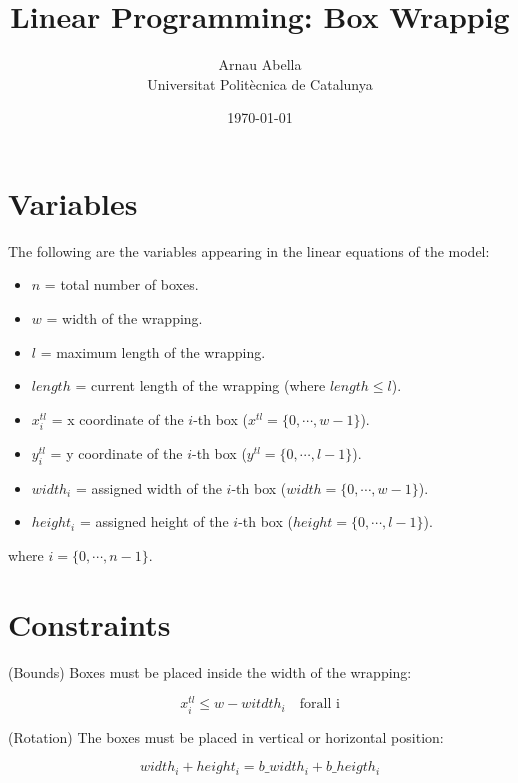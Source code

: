 \documentclass[12pt, a4paper]{article} %
\title{%
  Linear Programming: Box Wrappig
}
\author{%
  Arnau Abella \\
  \large{Universitat Polit\`ecnica de Catalunya}
}
\date{\today}
\begin{document}
\maketitle


\section{Variables}\label{variables}

The following are the variables appearing in the linear equations of the model:

\begin{itemize}
  \setlength{\itemindent}{-.0in}
  \item[] $n$ = total number of boxes.
  \item[] $w$ = width of the wrapping.
  \item[] $l$ = maximum length of the wrapping.
  \item[] $length$ = current length of the wrapping (where $length \leq l$).
  \item[] $x^{tl}_i$ = x coordinate of the $i$-th box (${x^{tl} = \{0,\cdots, w-1\}}$).
  \item[] $y^{tl}_i$ = y coordinate of the $i$-th box (${y^{tl} = \{0,\cdots, l-1\}}$).
  \item[] $width_i$ = assigned width of the $i$-th box (${width = \{0,\cdots, w-1\}}$).
  \item[] $height_i$ = assigned height of the $i$-th box (${height = \{0,\cdots, l-1\}}$).
\end{itemize}

where $i = \{0, \cdots, n-1\}$.


\section{Constraints}\label{constraints}

(Bounds) Boxes must be placed inside the width of the wrapping:

\begin{equation}\label{eq:one}
  x^{tl}_i \leq w - witdth_i \quad \text{forall i}
\end{equation}

\newpage

(Rotation) The boxes must be placed in vertical or horizontal position:

\begin{equation}\label{eq:two}
  width_i + height_i = b\_width_i + b\_heigth_i
\end{equation}
\end{document}
